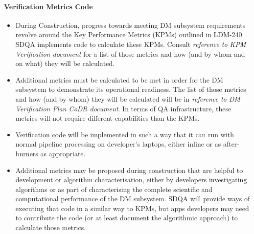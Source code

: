 \paragraph{Verification Metrics Code}
\label{sec:qaVerify}
\begin{itemize}

\item During Construction, progress towards meeting DM subsystem requirements revolve around the Key Performance Metrics (KPMs) outlined in LDM-240. SDQA implements code to calculate these KPMs. Consult \emph{ reference to KPM Verification document} for a list of those metrics and how (and by whom and on what) they will be calculated.

\item Additional metrics must be calculated to be met in order for the DM subsystem to demonstrate its operational readiness. The list of those metrics and how (and by whom) they will be calculated will be in \emph{reference to DM Verification Plan CoDR document}. In terms of QA infrastructure, these metrics will not require different capabilities than the KPMs.

\item Verification code will be implemented in such a way that it can run with normal pipeline processing on developer's laptops, either inline or as after-burners as appropriate.

\item Additional metrics may be proposed during construction that are helpful to development or algorithm characterisation, either by developers investigating algorithms or as part of characterising the complete scientific and computational performance of the DM subsystem. SDQA will provide ways of executing that code in a similar way to KPMs, but apps developers may need to contribute the code (or at least document the algorithmic approach) to calculate those metrics.

\end{itemize}

